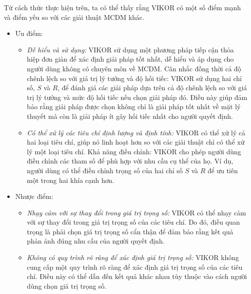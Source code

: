 Từ cách thức thực hiện trên, ta có thể thấy rằng VIKOR có một số điểm mạnh và điểm yếu so với các giải thuật MCDM khác. 
\begin{itemize}
    \item Ưu điểm:
        \begin{itemize}
            \item \textit{Dễ hiểu và sử dụng:} 
            VIKOR sử dụng một phương pháp tiếp cận thỏa hiệp đơn giản để xác định giải pháp tốt nhất, dễ hiểu và áp dụng cho người dùng không có chuyên môn về MCDM. Cân nhắc đồng thời cả độ chênh lệch so với giá trị lý tưởng và độ hối tiếc: VIKOR sử dụng hai chỉ số, $S$ và $R$, để đánh giá các giải pháp dựa trên cả độ chênh lệch so với giá trị lý tưởng và mức độ hối tiếc nếu chọn giải pháp đó. Điều này giúp đảm bảo rằng giải pháp được chọn không chỉ là giải pháp tốt nhất về mặt lý thuyết mà còn là giải pháp ít gây hối tiếc nhất cho người quyết định. 
            \item \textit{Có thể xử lý các tiêu chí định lượng và định tính:} 
            VIKOR có thể xử lý cả hai loại tiêu chí, giúp nó linh hoạt hơn so với các giải thuật chỉ có thể xử lý một loại tiêu chí. Khả năng điều chỉnh: VIKOR cho phép người dùng điều chỉnh các tham số để phù hợp với nhu cầu cụ thể của họ. Ví dụ, người dùng có thể điều chỉnh trọng số của hai chỉ số $S$ và $R$ để ưu tiên một trong hai khía cạnh hơn. 
        \end{itemize}
    \item Nhược điểm:
        \begin{itemize}
            \item \textit{Nhạy cảm với sự thay đổi trong giá trị trọng số:} 
            VIKOR có thể nhạy cảm với sự thay đổi trong giá trị trọng số của các tiêu chí. Do đó, điều quan trọng là phải chọn giá trị trọng số cẩn thận để đảm bảo rằng kết quả phản ánh đúng nhu cầu của người quyết định.
            \item \textit{Không có quy trình rõ ràng để xác định giá trị trọng số:}
            VIKOR không cung cấp một quy trình rõ ràng để xác định giá trị trọng số của các tiêu chí. Điều này có thể dẫn đến kết quả khác nhau tùy thuộc vào cách người dùng chọn giá trị trọng số.
        \end{itemize}
\end{itemize}

